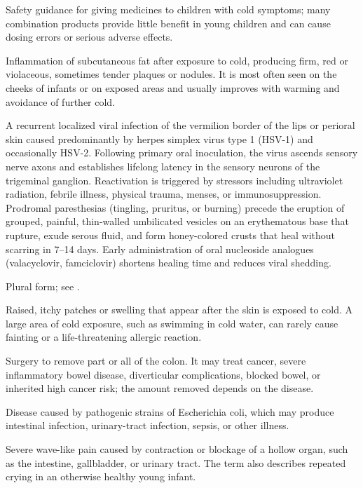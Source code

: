  Safety guidance for giving medicines to children with cold symptoms; many combination products provide little benefit in young children and can cause dosing errors or serious adverse effects.

 Inflammation of subcutaneous fat after exposure to cold, producing firm, red or violaceous, sometimes tender plaques or nodules. It is most often seen on the cheeks of infants or on exposed areas and usually improves with warming and avoidance of further cold.

 A recurrent localized viral infection of the vermilion border of the lips or perioral skin caused predominantly by herpes simplex virus type 1 (HSV-1) and occasionally HSV-2. Following primary oral inoculation, the virus ascends sensory nerve axons and establishes lifelong latency in the sensory neurons of the trigeminal ganglion. Reactivation is triggered by stressors including ultraviolet radiation, febrile illness, physical trauma, menses, or immunosuppression. Prodromal paresthesias (tingling, pruritus, or burning) precede the eruption of grouped, painful, thin-walled umbilicated vesicles on an erythematous base that rupture, exude serous fluid, and form honey-colored crusts that heal without scarring in 7--14 days. Early administration of oral nucleoside analogues (valacyclovir, famciclovir) shortens healing time and reduces viral shedding.

 Plural form; see .

 Raised, itchy patches or swelling that appear after the skin is exposed to cold. A large area of cold exposure, such as swimming in cold water, can rarely cause fainting or a life-threatening allergic reaction.

 Surgery to remove part or all of the colon. It may treat cancer, severe inflammatory bowel disease, diverticular complications, blocked bowel, or inherited high cancer risk; the amount removed depends on the disease.

 Disease caused by pathogenic strains of Escherichia coli, which may produce intestinal
infection, urinary-tract infection, sepsis, or other illness.

 Severe wave-like pain caused by contraction or blockage of a hollow organ, such as the intestine, gallbladder, or urinary tract. The term also describes repeated crying in an otherwise healthy young infant.

